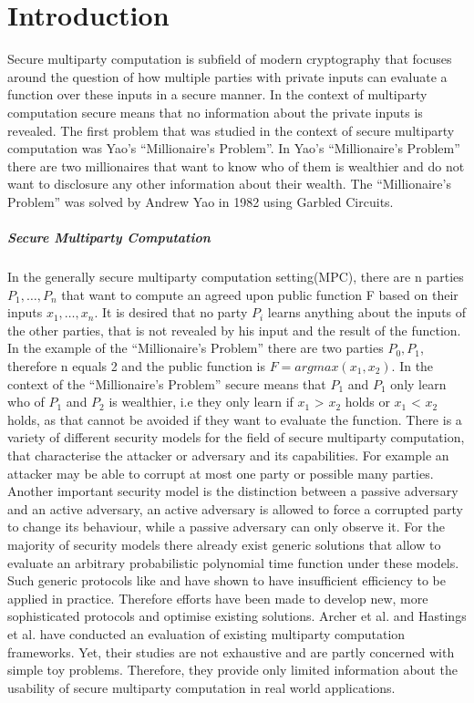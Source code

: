 \chapter {Introduction}
Secure multiparty computation is subfield of modern cryptography that focuses around the question of how multiple parties with private inputs can evaluate a function over these inputs in a secure manner. In the context of multiparty computation secure means that no information about the private inputs is revealed. The first problem that was studied in the context of secure multiparty computation was Yao's ``Millionaire’s Problem''. In Yao's ``Millionaire’s Problem'' there are two millionaires that want to know who of them is wealthier and do not want to disclosure any other information about their wealth. The ``Millionaire’s Problem'' was solved by Andrew Yao in 1982 \cite{4568388} using Garbled Circuits.
\paragraph{Secure Multiparty Computation}
In the generally secure multiparty computation setting(MPC), there are n parties $ P_1,\dots,P_{n} $ that want to compute an agreed upon public function F based on their inputs $ x_1,\dots,x_{n}$. It is desired that no party $P_i$ learns anything about the inputs of the other parties, that is not revealed by his input and the result of the function. In the example of the ``Millionaire’s Problem'' there are two parties $P_0,P_1 $, therefore n equals 2 and the public function is $F=argmax(x_1,x_2)$. In the context of the ``Millionaire’s Problem'' secure means that $P_1$ and $P_1$ only learn who of $P_1$ and $P_2$ is wealthier, i.e they only learn if $x_1$ > $x_2$ holds or $x_1$ < $x_2$ holds, as that cannot be avoided if they want to evaluate the function. 
There is a variety of different security models for the field of secure multiparty computation, that characterise the attacker or adversary and its capabilities. For example an attacker may be able to corrupt at most one party or possible many parties. Another important security model is the distinction between a passive adversary and an active adversary, an active adversary is allowed to force a corrupted party to change its behaviour, while a passive adversary can only observe it. 
For the majority of security models there already exist generic solutions that allow to evaluate an arbitrary probabilistic polynomial time function under these models. Such generic protocols like \cite{DBLP:conf/crypto/WigdersonD82} and \cite{4568388} have shown to have insufficient efficiency to be applied in practice. Therefore efforts have been made to develop new, more sophisticated protocols and optimise existing solutions.
Archer et al. \cite{Archer2018FromKT} and Hastings et al. \cite{hastings2019sok} have conducted an evaluation of existing multiparty computation frameworks. Yet, their studies are not exhaustive and are partly concerned with simple toy problems.
Therefore, they provide only limited information about the usability of secure multiparty computation in real world applications.  
